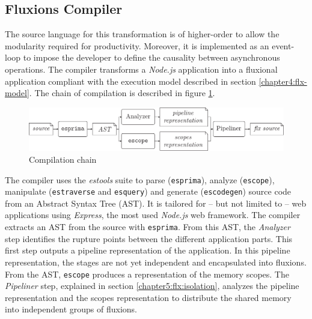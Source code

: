 \subsection{Fluxions Compiler} \label{chapter5:flx:compiler}

The source language for this transformation is of higher-order to allow the modularity required for productivity. 
Moreover, it is implemented as an event-loop to impose the developer to define the causality between asynchronous operations.
The compiler transforms a \textit{Node.js} application into a fluxional application compliant with the execution model described in section \ref{chapter4:flx-model}.
The chain of compilation is described in figure \ref{fig:compilation}.

\begin{figure}
  \includegraphics[width=\linewidth]{../resources/compiler-stream.pdf}
  \caption{Compilation chain}
  \label{fig:compilation}
\end{figure}

The compiler uses the \textit{estools} suite to parse (\texttt{esprima}), analyze (\texttt{escope}), manipulate (\texttt{estraverse} and \texttt{esquery}) and generate (\texttt{escodegen}) source code from an Abstract Syntax Tree (AST).
It is tailored for -- but not limited to -- web applications using \textit{Express}, the most used \textit{Node.js} web framework.
The compiler extracts an AST from the source with \texttt{esprima}.
From this AST, the \textit{Analyzer} step identifies the rupture points between the different application parts. %
This first step outputs a pipeline representation of the application.
In this pipeline representation, the stages are not yet independent and encapsulated into fluxions.
From the AST, \texttt{escope} produces a representation of the memory scopes.
The \textit{Pipeliner} step, explained in section \ref{chapter5:flx:isolation}, analyzes the pipeline representation and the scopes representation to distribute the shared memory into independent groups of fluxions.

